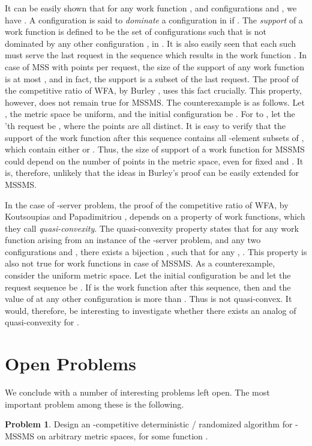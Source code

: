 \documentclass[11pt]{article}
\theoremstyle{plain}\newtheorem{theorem}{Theorem}
\theoremstyle{definition}
\newtheorem{problem}{Problem}
\theoremstyle{remark}
\begin{document}
It can be easily shown that for any work function , and configurations  and , we have . A configuration  is said to \textit{dominate} a configuration  in  if . The \textit{support} of a work function is defined to be the set of configurations  such that  is not dominated by any other configuration , in . It is also easily seen that each such  must serve the last request in the sequence which results in the work function . In case of MSS with  points per request, the size of the support of any work function is at most , and in fact, the support is a subset of the last request. The proof of the competitive ratio of WFA, by Burley \cite{Burley96}, uses this fact crucially. This property, however, does not remain true for MSSMS. The counterexample is as follows. Let , the metric space be uniform, and the initial configuration be . For  to , let the 'th request be , where the points  are all distinct. It is easy to verify that the support of the work function after this sequence contains all -element subsets of , which contain either  or . Thus, the size of support of a work function for MSSMS could depend on the number of points in the metric space, even for fixed  and . It is, therefore, unlikely that the ideas in Burley's proof can be easily extended for MSSMS.

In the case of -server problem, the proof of the competitive ratio of WFA, by Koutsoupias and Papadimitriou \cite{KoutsoupiasP95}, depends on a property of work functions, which they call \textit{quasi-convexity}. The quasi-convexity property states that for any work function  arising from an instance  of the -server problem, and any two configurations  and , there exists a bijection , such that for any , . This property is also not true for work functions in case of MSSMS. As a counterexample, consider the uniform metric space. Let the initial configuration be  and let the request sequence be . If  is the work function after this sequence, then  and the value of  at any other configuration is more than . Thus  is not quasi-convex. It would, therefore, be interesting to investigate whether there exists an analog of quasi-convexity for .

\section{Open Problems}\label{sec_open_problems}

We conclude with a number of interesting problems left open. The most important problem among these is the following.
\begin{problem}
Design an -competitive deterministic / randomized algorithm for -MSSMS on arbitrary metric spaces, for some function .
\end{problem}
\end{document}
